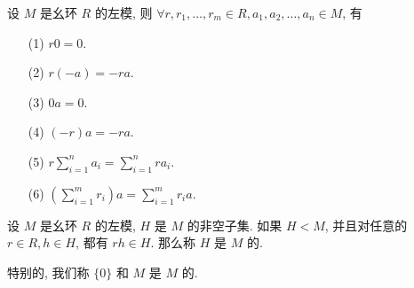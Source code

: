 \begin{proposition}
	设 $M$ 是幺环 $R$ 的左模, 则 $\forall r,r_1,\ldots,r_m\in R,a_1,a_2,\ldots,a_n\in M$, 有
	\begin{itemize}
		\item[(1)] $r0=0$.
		\item[(2)] $r(-a)=-ra$.
		\item[(3)] $0a=0$.
		\item[(4)] $(-r)a=-ra$.
		\item[(5)] $r\sum\limits_{i=1}^na_i=\sum\limits_{i=1}^n ra_i$.
		\item[(6)] $(\sum\limits_{i=1}^m r_i)a=\sum\limits_{i=1}^m r_ia$.
	\end{itemize}
\end{proposition}

\begin{definition}
	设 $M$ 是幺环 $R$ 的左模, $H$ 是 $M$ 的非空子集. 如果 $H<M$, 并且对任意的 $r\in R,h\in H$, 都有 $rh\in H$. 那么称 $H$ 是 $M$ 的.

	特别的, 我们称 $\{0\}$ 和 $M$ 是 $M$ 的.
\end{definition}